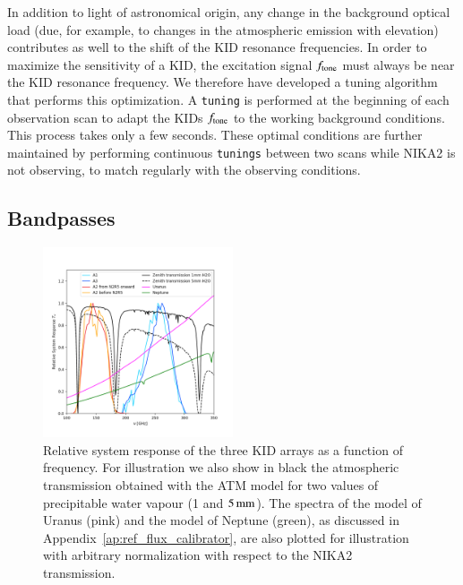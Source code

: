 \documentclass[traditionalabstract]{aa}
\begin{document}
In addition to light of astronomical origin, any change in the
background optical load (due, for example, to changes in
the atmospheric emission with elevation) contributes as well to
the shift of the KID resonance frequencies. In
order to maximize the sensitivity of a KID, the excitation signal $f_{\rm{tone}}$
must always be near the KID resonance frequency. We therefore have
developed a tuning algorithm that performs this optimization. A {\tt tuning} is performed at the beginning
of each observation scan to adapt the KIDs $f_{\rm{tone}}$ to the working background
conditions.
This process takes only a few seconds.
These optimal conditions are further maintained by performing
continuous {\tt tunings} between two scans while NIKA2 is not observing, to
match regularly with the observing conditions.

\subsection{Bandpasses}
\label{se:instru_bandpass}

\begin{figure}[ht!] %
\begin{center}
\includegraphics[clip,trim={0, 1cm, 0, 2cm},width=0.5\textwidth]{Figures/bandpasses_nika2_colorsok.png}
\caption[NIKA2 transmission]{Relative system response of the three KID
  arrays as a
  function of frequency. For illustration we also show in black
  the atmospheric transmission obtained with the ATM model \citep{ATM,
    Pardo2001} for two values of precipitable water vapour (1 and
  $5\,\rm{mm}$).
  The spectra of the model of Uranus (pink) and the model of
  Neptune
  (green), as discussed in Appendix~\ref{ap:ref_flux_calibrator}, are
  also plotted for illustration with arbitrary
  normalization with respect to the NIKA2 transmission.} 
 \label{spectralband1}
\end{center}
\end{figure}
\end{document}
